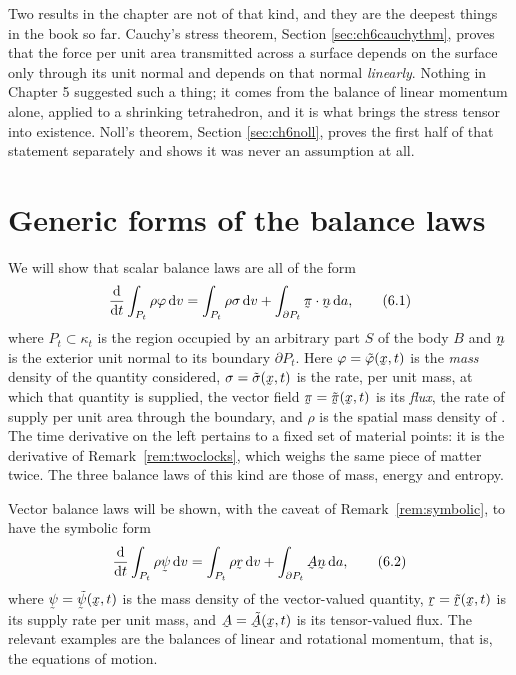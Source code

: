 Two results in the chapter are not of that kind, and they are the
deepest things in the book so far. Cauchy's stress theorem, Section
\ref{sec:ch6cauchythm}, proves that the force per unit area transmitted
across a surface depends on the surface only through its unit normal
and depends on that normal \emph{linearly}. Nothing in Chapter 5
suggested such a thing; it comes from the balance of linear momentum
alone, applied to a shrinking tetrahedron, and it is what brings the
stress tensor into existence. Noll's theorem, Section
\ref{sec:ch6noll}, proves the first half of that statement separately
and shows it was never an assumption at all.

\section{Generic forms of the balance laws}\label{sec:ch6generic}

We will show that scalar balance laws are all of the form
\begin{equation}
   \frac{\dl}{\dl t}\int_{P_{t}}\rho\varphi\,\dl v
   =\int_{P_{t}}\rho\sigma\,\dl v
   +\int_{\partial P_{t}}\ip{\vek{\pi}}\bn\,\dl a ,
   \tag{6.1}\label{eq:6.1}
\end{equation}
where $P_{t}\subset\kappa_{t}$ is the region occupied by an arbitrary
part $S$ of the body $B$ and $\bn$ is the exterior unit normal to its
boundary $\partial P_{t}$. Here $\varphi=\tilde\varphi(\bx,t)$ is the
\emph{mass} density of the quantity considered, $\sigma=
\tilde\sigma(\bx,t)$ is the rate, per unit mass, at which that quantity
is supplied, the vector field $\vek{\pi}=\tilde{\vek{\pi}}(\bx,t)$ is
its \emph{flux}, the rate of supply per unit area through the boundary,
and $\rho$ is the spatial mass density of . The time
derivative on the left pertains to a fixed set of material points: it
is the derivative of Remark~\ref{rem:twoclocks}, which weighs the same
piece of matter twice. The three balance laws of this kind are those of
mass, energy and entropy.

Vector balance laws will be shown, with the caveat of
Remark~\ref{rem:symbolic}, to have the symbolic form
\begin{equation}
   \frac{\dl}{\dl t}\int_{P_{t}}\rho\vek{\psi}\,\dl v
   =\int_{P_{t}}\rho\br\,\dl v
   +\int_{\partial P_{t}}\bA\bn\,\dl a ,
   \tag{6.2}\label{eq:6.2}
\end{equation}
where $\vek{\psi}=\tilde{\vek{\psi}}(\bx,t)$ is the mass density of the
vector-valued quantity, $\br=\tilde\br(\bx,t)$ is its supply rate per
unit mass, and $\bA=\tilde\bA(\bx,t)$ is its tensor-valued flux. The
relevant examples are the balances of linear and rotational momentum,
that is, the equations of motion.

